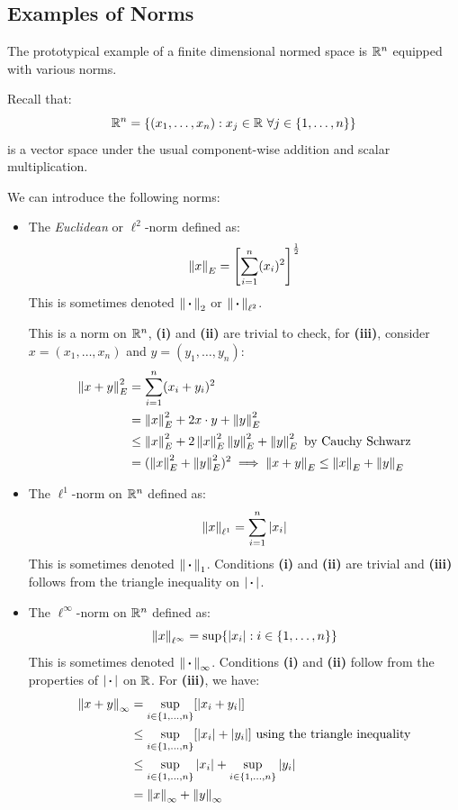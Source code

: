 \documentclass[../main.tex]{subfiles}
\begin{document}
\subsection{Examples of Norms} \label{normExamples}
\begin{example}
  The prototypical example of a finite dimensional normed space is $\mathbb{R}^n$ equipped with various norms.

  Recall that:
  \[
    \mathbb{R}^n = \{(x_1, \ldots, x_n): x_j \in \mathbb{R}\ \forall j \in \{1, \ldots, n\}\}
  \]
  is a vector space under the usual component-wise addition and scalar multiplication.

  We can introduce the following norms:
  \begin{itemize}
    \item The \textit{Euclidean} or $\ell^2$-norm defined as:
      \[
        \left\lVert x \right\rVert_{E} = \left[\sum_{i = 1}^{n} (x_i)^2\right]^{\frac{1}{2}}
      \]
      This is sometimes denoted $\left\lVert {\hspace{0.18em}\boldsymbol{\cdot}\hspace{0.18em}} \right\rVert_2$ or $\left\lVert {\hspace{0.18em}\boldsymbol{\cdot}\hspace{0.18em}} \right\rVert_{\ell^2}$.

      This is a norm on $\mathbb{R}^n$, \textbf{(i)} and \textbf{(ii)} are trivial to check, for \textbf{(iii)}, consider $x = (x_1, \ldots, x_n)$ and $y = (y_1, \ldots, y_n)$:
      \begin{align*}
        \left\lVert x + y \right\rVert^2_E &= \sum_{i = 1}^{n} (x_i + y_i)^2 \\
                         &= \left\lVert x \right\rVert^2_E + 2 x \cdot y+ \left\lVert y \right\rVert^2_E \\
                         &\leq \left\lVert x \right\rVert^2_E + 2 \left\lVert x \right\rVert^2_E \left\lVert y \right\rVert^2_E + \left\lVert y \right\rVert^2_E \text{ by Cauchy Schwarz} \\
                         &= (\left\lVert x \right\rVert^2_E + \left\lVert y \right\rVert^2_E)^2 \implies \left\lVert x + y \right\rVert_E \leq \left\lVert x \right\rVert_E + \left\lVert y \right\rVert_E
      \end{align*}
    \item The $\ell^1$-norm on $\mathbb{R}^n$ defined as:
      \[
        \left\lVert x \right\rVert_{\ell^1} = \sum_{i = 1}^{n} |x_i|
      \]
      This is sometimes denoted $\left\lVert {\hspace{0.18em}\boldsymbol{\cdot}\hspace{0.18em}} \right\rVert_1$.
      Conditions \textbf{(i)} and \textbf{(ii)} are trivial and \textbf{(iii)} follows from the triangle inequality on $|{\hspace{0.18em}\boldsymbol{\cdot}\hspace{0.18em}}|$.
    \item The $\ell^{\infty}$-norm on $\mathbb{R}^n$ defined as:
      \[
        \left\lVert x \right\rVert_{\ell^{\infty}} = \sup \{|x_i| : i \in \{1, \ldots, n\}\}
      \]
      This is sometimes denoted $\left\lVert {\hspace{0.18em}\boldsymbol{\cdot}\hspace{0.18em}} \right\rVert_{\infty}$.
      Conditions \textbf{(i)} and \textbf{(ii)} follow from the properties of $|{\hspace{0.18em}\boldsymbol{\cdot}\hspace{0.18em}}|$ on $\mathbb{R}$.
      For \textbf{(iii)}, we have:
      \begin{align*}
        \left\lVert x + y \right\rVert_{\infty} &= \sup_{i \in \{1, \ldots, n\}} [|x_i + y_i|] \\
                              &\leq \sup_{i \in \{1, \ldots, n\}} [|x_i| + |y_i|] \text{ using the triangle inequality} \\
                              &\leq \sup_{i \in \{1, \ldots, n\}} |x_i| + \sup_{i \in \{1, \ldots, n\}} |y_i| \\
                              &= \left\lVert x \right\rVert_{\infty} + \left\lVert y \right\rVert_{\infty}
      \end{align*}
  \end{itemize}
\end{example}
\end{document}
